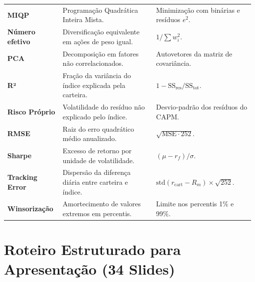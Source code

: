 \documentclass[11pt,a4paper]{article}
\begin{document}
\begin{longtable}{p{} p{} p{}}
\textbf{MIQP} & Programação Quadrática Inteira Mista. & Minimização com binárias e resíduos $e^2$. \\
\textbf{Número efetivo} & Diversificação equivalente em ações de peso igual. & $1 / \sum w_i^2$. \\
\textbf{PCA} & Decomposição em fatores não correlacionados. & Autovetores da matriz de covariância. \\
\textbf{R²} & Fração da variância do índice explicada pela carteira. & $1 - \text{SS}_{\text{res}} / \text{SS}_{\text{tot}}$. \\
\textbf{Risco Próprio} & Volatilidade do resíduo não explicado pelo índice. & Desvio-padrão dos resíduos do CAPM. \\
\textbf{RMSE} & Raiz do erro quadrático médio anualizado. & $\sqrt{\text{MSE} \cdot 252}$. \\
\textbf{Sharpe} & Excesso de retorno por unidade de volatilidade. & $(\mu - r_f) / \sigma$. \\
\textbf{Tracking Error} & Dispersão da diferença diária entre carteira e índice. & $\text{std}(r_{\text{cart}} - R_m) \times \sqrt{252}$. \\
\textbf{Winsorização} & Amortecimento de valores extremos em percentis. & Limite nos percentis 1\% e 99\%. \\
\bottomrule
\end{longtable}

\newpage
\section{Roteiro Estruturado para Apresentação (34 Slides)}
\end{document}
